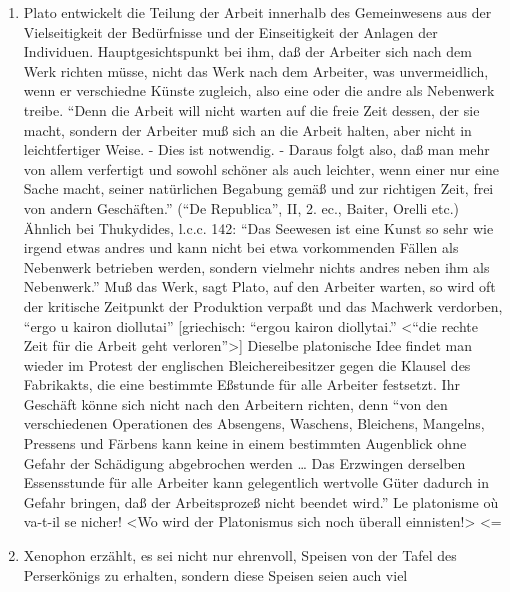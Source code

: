 {\begin{enumerate}
  , die der Teilung der Arbeit gegenübersteht, ``denn bei diesen gibt es
  Wohlstand, bei jenen aber auch die Unabhängigkeit''. Man muß dabei
  erwägen, daß es noch zur Zeit des Sturzes der 30 Tyrannen keine 5.000
  Athener ohne Grundeigentum gab. \textless{}=
\item
  Plato entwickelt die Teilung der Arbeit innerhalb des Gemeinwesens aus
  der Vielseitigkeit der Bedürfnisse und der Einseitigkeit der Anlagen
  der Individuen. Hauptgesichtspunkt bei ihm, daß der Arbeiter sich nach
  dem Werk richten müsse, nicht das Werk nach dem Arbeiter, was
  unvermeidlich, wenn er verschiedne Künste zugleich, also eine oder die
  andre als Nebenwerk treibe. ``Denn die Arbeit will nicht warten auf
  die freie Zeit dessen, der sie macht, sondern der Arbeiter muß sich an
  die Arbeit halten, aber nicht in leichtfertiger Weise. - Dies ist
  notwendig. - Daraus folgt also, daß man mehr von allem verfertigt und
  sowohl schöner als auch leichter, wenn einer nur eine Sache macht,
  seiner natürlichen Begabung gemäß und zur richtigen Zeit, frei von
  andern Geschäften.'' (``De Republica'', II, 2. ec., Baiter, Orelli
  etc.) Ähnlich bei Thukydides, l.c.c. 142: ``Das Seewesen ist eine
  Kunst so sehr wie irgend etwas andres und kann nicht bei etwa
  vorkommenden Fällen als Nebenwerk betrieben werden, sondern vielmehr
  nichts andres neben ihm als Nebenwerk.'' Muß das Werk, sagt Plato, auf
  den Arbeiter warten, so wird oft der kritische Zeitpunkt der
  Produktion verpaßt und das Machwerk verdorben, ``ergo u kairon
  diollutai'' {[}griechisch: ``ergou kairon diollytai.''
  \textless{}``die rechte Zeit für die Arbeit geht
  verloren''\textgreater{}{]} Dieselbe platonische Idee findet man
  wieder im Protest der englischen Bleichereibesitzer gegen die Klausel
  des Fabrikakts, die eine bestimmte Eßstunde für alle Arbeiter
  festsetzt. Ihr Geschäft könne sich nicht nach den Arbeitern richten,
  denn ``von den verschiedenen Operationen des Absengens, Waschens,
  Bleichens, Mangelns, Pressens und Färbens kann keine in einem
  bestimmten Augenblick ohne Gefahr der Schädigung abgebrochen werden
  \ldots{} Das Erzwingen derselben Essensstunde für alle Arbeiter kann
  gelegentlich wertvolle Güter dadurch in Gefahr bringen, daß der
  Arbeitsprozeß nicht beendet wird.'' Le platonisme où va-t-il se
  nicher! \textless{}Wo wird der Platonismus sich noch überall
  einnisten!\textgreater{} \textless{}=
\item
  Xenophon erzählt, es sei nicht nur ehrenvoll, Speisen von der Tafel
  des Perserkönigs zu erhalten, sondern diese Speisen seien auch viel

\end{enumerate}}
